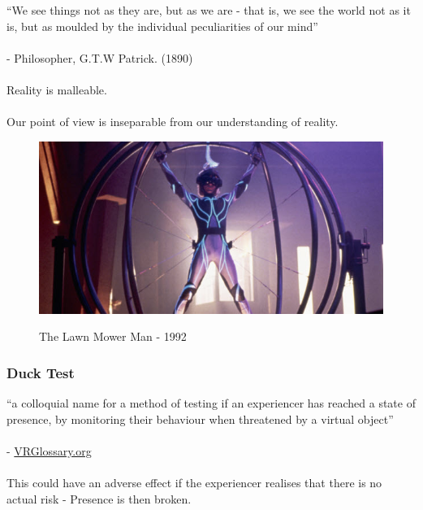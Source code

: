 \begin{frame}
	``We see things not as they are, but as we are - that is, we see the world not as it is, but as moulded by the individual peculiarities of our mind'' \\~\\ - Philosopher, G.T.W Patrick. (1890) \\~\\
	\pause
	Reality is malleable. \\~\\ 
	\pause
	Our point of view is inseparable from our understanding of reality. 	
	
\end{frame}

\begin{frame}
	\begin{figure}
		\href{https://www.youtube.com/watch?v=zTrgHXNAs24}{ \includegraphics[scale=.3]{assets/mower}  }
		\caption{The Lawn Mower Man - 1992}
	\end{figure}
\end{frame}

\begin{frame}
	\frametitle{Duck Test}
	``a colloquial name for a method of testing if an experiencer has reached a state of presence, by monitoring their behaviour when threatened by a virtual object'' \\~\\
	- \href{http://www.vrglossary.org/glossary/duck-test/}{VRGlossary.org} \\~\\
	This could have an adverse effect if the experiencer realises that there is no actual risk - Presence is then broken.
		
\end{frame}

